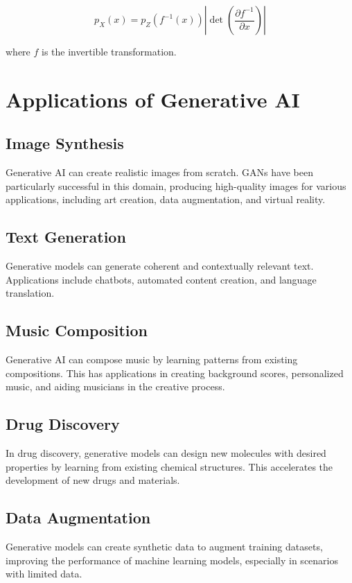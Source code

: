 \begin{equation}
p_X(x) = p_Z(f^{-1}(x)) \left| \det \left( \frac{\partial f^{-1}}{\partial x} \right) \right|
\end{equation}

where \( f \) is the invertible transformation.

\section{Applications of Generative AI}

\subsection{Image Synthesis}
Generative AI can create realistic images from scratch. GANs have been particularly successful in this domain, producing high-quality images for various applications, including art creation, data augmentation, and virtual reality.

\subsection{Text Generation}
Generative models can generate coherent and contextually relevant text. Applications include chatbots, automated content creation, and language translation.

\subsection{Music Composition}
Generative AI can compose music by learning patterns from existing compositions. This has applications in creating background scores, personalized music, and aiding musicians in the creative process.

\subsection{Drug Discovery}
In drug discovery, generative models can design new molecules with desired properties by learning from existing chemical structures. This accelerates the development of new drugs and materials.

\subsection{Data Augmentation}
Generative models can create synthetic data to augment training datasets, improving the performance of machine learning models, especially in scenarios with limited data.

